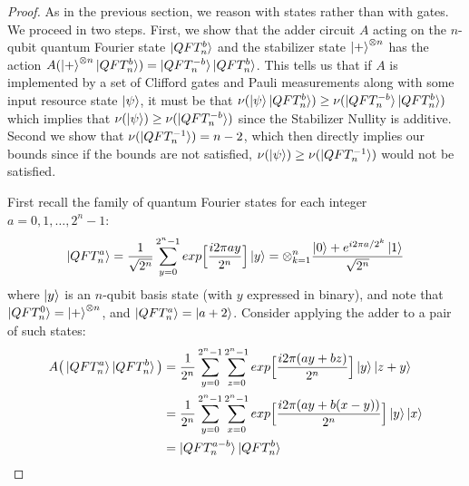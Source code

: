 \documentclass[12pt]{dalthesis}
\begin{document}
\begin{proof}
  As in the previous section, we reason with states rather than with gates.
We proceed in two steps. First, we show that the adder circuit $A$ acting on the $n$-qubit quantum Fourier state $\ket{QFT_n^b}$ and the stabilizer state $\ket{+}^{\otimes n}$ has the action $A(\ket{+}^{\otimes n} \ket{QFT_n^b}) = \ket{QFT_n^{-b}}\ket{QFT_n^b}$. This tells us that if $A$ is implemented by a set of Clifford gates and Pauli measurements along with some input resource state $\ket{\psi}$, it must be that $\nu (\ket{\psi} \ket{QFT_n^b}) \geq \nu(\ket{QFT_n^{-b}} \ket{QFT_n^b})$ which implies that $\nu (\ket{\psi}) \geq \nu(\ket{QFT_n^{-b}})$ since the Stabilizer Nullity is additive. Second we show that $\nu(\ket{QFT_n^{-1}}) = n-2$, which then directly implies our bounds since if the bounds are not satisfied, $\nu(\ket{\psi}) \geq \nu(\ket{QFT_n^{-1}})$ would not be satisfied.

First recall the family of quantum Fourier states for each integer $a = 0, 1, \dots, 2^n - 1$:
\begin{equation}
\label{QFTdef}
\ket{QFT_n^a} = \frac{1}{\sqrt{2^n}} \sum\limits_{y=0}^{2^n-1} exp \Big[ \frac{i2 \pi a y}{2^n} \Big] \ket{y} = \otimes_{k=1}^n \frac{\ket{0} + e^{i2\pi a/2^k} \ket{1}}{\sqrt{2^n}}
\end{equation}
where $\ket{y}$ is an $n$-qubit basis state (with $y$ expressed in binary), and note that $\ket{QFT_n^0} = \ket{+}^{\otimes n}$, and $\ket{QFT_n^a} = \ket{a + 2}$. Consider applying the adder to a pair of such states:
\begin{equation}
\begin{split}
A \big(\ket{QFT_n^a} \ket{QFT_n^b} \big) & = \frac{1}{2^n} \sum\limits_{y=0}^{2^n-1} \sum\limits_{z=0}^{2^n-1} exp \Big[ \frac{i2 \pi (ay + bz)}{2^n} \Big] \ket{y}\ket{z+y} \\
& = \frac{1}{2^n} \sum\limits_{y=0}^{2^n-1} \sum\limits_{x=0}^{2^n-1} exp \Big[ \frac{i2 \pi (ay + b(x-y))}{2^n} \Big] \ket{y}\ket{x} \\
& = \ket{QFT_n^{a-b}}\ket{QFT_n^b}
\end{split}
\end{equation}


\end{proof}
\end{document}
